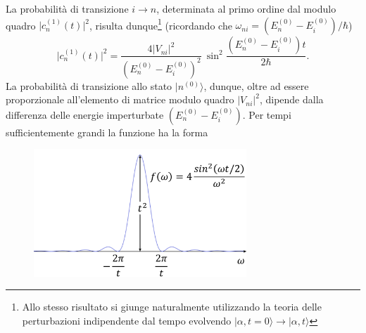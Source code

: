 \documentclass[a4paper,12pt,oneside]{book}
\begin{document}
La probabilità di transizione $i\rightarrow n $, determinata al primo ordine dal modulo quadro $\vert c_n ^{(1)} (t) \vert ^2$, risulta dunque\footnote{Allo stesso risultato si giunge naturalmente utilizzando la teoria delle perturbazioni indipendente dal tempo evolvendo $ \vert \alpha , t =0 \rangle \rightarrow \vert \alpha , t \rangle$} (ricordando che $\omega _{ni} = ( E_n ^{(0)}- E_i ^{(0)})/ \hbar$)
\begin{equation}
\vert c_n ^{(1)} (t) \vert ^2 = \frac{4\vert V_{ni} \vert ^2}{\left( E_n ^{(0)} - E_i ^{(0)} \right) ^2}\ \sin ^2\frac{\left( E_n ^{(0)} - E_i ^{(0)} \right) t}{2 \hbar}.
\label{eq:cap15_6}
\end{equation}
La probabilità di transizione allo stato $\vert n ^{(0)} \rangle$, dunque, oltre ad essere proporzionale all'elemento di matrice modulo quadro $\vert V_{ni}\vert ^2$, dipende dalla differenza delle energie imperturbate $(E_n ^{(0)} - E_i ^{(0)}) $. Per tempi sufficientemente grandi la funzione ha la forma
\begin{figure}[!htbp]
\begin{center}
\includegraphics[width=8cm]{immagini/cap_15/fig_15_1.png}
\end{center}
\end{figure}
\end{document}
